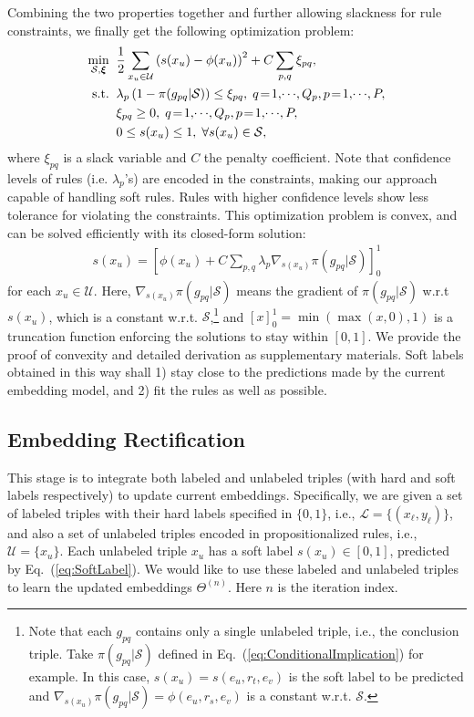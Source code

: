 \documentclass[letterpaper]{article} \usepackage{aaai18}  \usepackage{times}  \usepackage{helvet}  \usepackage{courier}  \usepackage{url}  \usepackage{graphicx}  \usepackage{amsmath}
\begin{document}
Combining the two properties together and further allowing slackness for rule constraints, we finally get the following optimization problem:
\begin{align}\label{eq:SoftLabelPrediction}
\min_{\mathcal{S},\boldsymbol{\xi}}\;\; & \frac{1}{2}\sum_{x_u \in \mathcal{U}} \left(s(x_u) - \phi(x_u)\right)^2 + C\sum_{p,q} \xi_{pq}, \notag \\
\textrm{s.t.}\;\;                       & \lambda_p \left(1 - \pi(g_{pq}|\mathcal{S})\right) \leq \xi_{pq}, \; q\!=\!1,\!\cdots\!,Q_p, p\!=\!1,\!\cdots\!,P, \notag \\
                                        & \xi_{pq} \geq 0, \; q\!=\!1,\!\cdots\!,Q_p, p\!=\!1,\!\cdots\!,P, \notag \\
                                        & 0 \leq s(x_u) \leq 1, \; \forall s(x_u) \in \mathcal{S},
\end{align}
where $\xi_{pq}$ is a slack variable and $C$ the penalty coefficient. Note that confidence levels of rules (i.e. $\lambda_p$'s) are encoded in the constraints, making our approach capable of handling soft rules. Rules with higher confidence levels show less tolerance for violating the constraints. This optimization problem is convex, and can be solved efficiently with its closed-form solution:
\begin{eqnarray}\label{eq:SoftLabel}
s(x_u) = \left[ \phi(x_u) + C \sum\nolimits_{p,q} \!\!\lambda_p \nabla_{s(x_u)} \pi(g_{pq}|\mathcal{S}) \right]_0^1
\end{eqnarray}
for each $x_u \in \mathcal{U}$. Here, $\nabla_{s(x_u)} \pi(g_{pq}|\mathcal{S})$ means the gradient of $\pi(g_{pq}|\mathcal{S})$ w.r.t $s(x_u)$, which is a constant w.r.t. $\mathcal{S}$,\footnote{Note that each $g_{pq}$ contains only a single unlabeled triple, i.e., the conclusion triple. Take $\pi(g_{pq}|\mathcal{S})$ defined in Eq.~(\ref{eq:ConditionalImplication}) for example. In this case, $s(x_u)=s(e_u, r_t, e_v)$ is the soft label to be predicted and $\nabla_{s(x_u)} \pi(g_{pq}|\mathcal{S})=\phi(e_u, r_s, e_v)$ is a constant w.r.t. $\mathcal{S}$.} and $[x]_0^1=\min(\max(x,0),1)$ is a truncation function enforcing the solutions to stay within $[0,1]$. We provide the proof of convexity and detailed derivation as supplementary materials. Soft labels obtained in this way shall 1) stay close to the predictions made by the current embedding model, and 2) fit the rules as well as possible.

\subsection{Embedding Rectification}
This stage is to integrate both labeled and unlabeled triples (with hard and soft labels respectively) to update current embeddings. Specifically, we are given a set of labeled triples with their hard labels specified in $\{0,1\}$, i.e., $\mathcal{L}\!=\!\{(x_\ell,y_\ell)\}$, and also a set of unlabeled triples encoded in propositionalized rules, i.e., $\mathcal{U}=\{x_u\}$. Each unlabeled triple $x_u$ has a soft label $s(x_u)\in[0,1]$, predicted by Eq.~(\ref{eq:SoftLabel}). We would like to use these labeled and unlabeled triples to learn the updated embeddings $\Theta^{(n)}$. Here $n$ is the iteration index.
\end{document}
